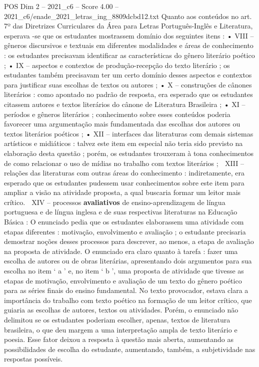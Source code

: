 \begin{textsample}{POS Dim 2 – 2021\_c6 – Score 4.00 – 2021\_c6/enade\_2021\_letras\_ing\_8809dcbd12.txt}
Quanto aos conteúdos no art. 7º das Diretrizes Curriculares da Área para Letras Português-Inglês e Literatura, esperava -se que os estudantes mostrassem domínio dos seguintes itens : • VIII – gêneros discursivos e textuais em diferentes modalidades e áreas de conhecimento : os estudantes precisavam identificar as características do gênero literário poético ; • IX – aspectos e contextos de produção-recepção do texto literário ; os estudantes também precisavam ter um certo domínio desses aspectos e contextos para justificar suas escolhas de textos ou autores ; • X – construções de cânones literários : como apontado no padrão de resposta, era esperado que os estudantes citassem autores e textos literários do cânone de Literatura Brasileira ; • XI – períodos e gêneros literários ; conhecimento sobre esses conteúdos poderia favorecer uma argumentação mais fundamentada das escolhas dos autores ou textos literários poéticos ; • XII – interfaces das literaturas com demais sistemas artísticos e midiáticos : talvez este item em especial não teria sido previsto na elaboração desta questão ; porém, os estudantes trouxeram à tona conhecimentos de como relacionar o uso de mídias no trabalho com textos literários ;  XIII – relações das literaturas com outras áreas do conhecimento : indiretamente, era esperado que os estudantes pudessem usar conhecimentos sobre este item para ampliar a visão na atividade proposta, a qual buscaria formar um leitor mais crítico.  XIV – processos \textbf{avaliativos} de ensino-aprendizagem de língua portuguesa e de língua inglesa e de suas respectivas literaturas na Educação Básica : O enunciado pedia que os estudantes elaborassem uma atividade com etapas diferentes : motivação, envolvimento e avaliação ; o estudante precisaria demostrar noções desses processos para descrever, ao menos, a etapa de avaliação na proposta de atividade.
O enunciado era claro quanto à tarefa : fazer uma escolha de autores ou de obras literárias, apresentando dois argumentos para sua escolha no item ‘ a ’ e, no item ‘ b ’, uma proposta de atividade que tivesse as etapas de motivação, envolvimento e avaliação de um texto do gênero poético para as séries finais do ensino fundamental.
No texto provocador, estava clara a importância do trabalho com texto poético na formação de um leitor crítico, que guiaria as escolhas de autores, textos ou atividades.
Porém, o enunciado não delimitou se os estudantes poderiam escolher, apenas, textos de literatura brasileira, o que deu margem a uma interpretação ampla de texto literário e poesia.
Esse fator deixou a resposta à questão mais aberta, aumentando as possibilidades de escolha do estudante, aumentando, também, a subjetividade nas respostas possíveis.

\end{textsample}
